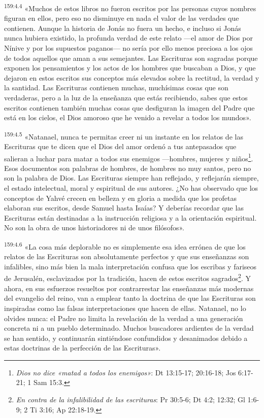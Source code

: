 \par 
\textsuperscript{159:4.4} «Muchos de estos libros no fueron escritos por las personas cuyos nombres figuran en ellos, pero eso no disminuye en nada el valor de las verdades que contienen. Aunque la historia de Jonás no fuera un hecho, e incluso si Jonás nunca hubiera existido, la profunda verdad de este relato ---el amor de Dios por Nínive y por los supuestos paganos--- no sería por ello menos preciosa a los ojos de todos aquellos que aman a sus semejantes. Las Escrituras son sagradas porque exponen los pensamientos y los actos de los hombres que buscaban a Dios, y que dejaron en estos escritos sus conceptos más elevados sobre la rectitud, la verdad y la santidad. Las Escrituras contienen muchas, muchísimas cosas que son verdaderas, pero a la luz de la enseñanza que estás recibiendo, sabes que estos escritos contienen también muchas cosas que desfiguran la imagen del Padre que está en los cielos, el Dios amoroso que he venido a revelar a todos los mundos».

\par 
\textsuperscript{159:4.5} «Natanael, nunca te permitas creer ni un instante en los relatos de las Escrituras que te dicen que el Dios del amor ordenó a tus antepasados que salieran a luchar para matar a todos sus enemigos ---hombres, mujeres y niños\footnote{\textit{Dios no dice «matad a todos los enemigos»}: Dt 13:15-17; 20:16-18; Jos 6:17-21; 1 Sam 15:3.}. Esos documentos son palabras de hombres, de hombres no muy santos, pero no son la palabra de Dios. Las Escrituras siempre han reflejado, y reflejarán siempre, el estado intelectual, moral y espiritual de sus autores. ¿No has observado que los conceptos de Yahvé crecen en belleza y en gloria a medida que los profetas elaboran sus escritos, desde Samuel hasta Isaías? Y deberías recordar que las Escrituras están destinadas a la instrucción religiosa y a la orientación espiritual. No son la obra de unos historiadores ni de unos filósofos».

\par 
\textsuperscript{159:4.6} «La cosa más deplorable no es simplemente esa idea errónea de que los relatos de las Escrituras son absolutamente perfectos y que sus enseñanzas son infalibles, sino más bien la mala interpretación confusa que los escribas y fariseos de Jerusalén, esclavizados por la tradición, hacen de estos escritos sagrados\footnote{\textit{En contra de la infalibilidad de las escrituras}: Pr 30:5-6; Dt 4:2; 12:32; Gl 1:6-9; 2 Ti 3:16; Ap 22:18-19.}. Y ahora, en sus esfuerzos resueltos por contrarrestar las enseñanzas más modernas del evangelio del reino, van a emplear tanto la doctrina de que las Escrituras son inspiradas como las falsas interpretaciones que hacen de ellas. Natanael, no lo olvides nunca: el Padre no limita la revelación de la verdad a una generación concreta ni a un pueblo determinado. Muchos buscadores ardientes de la verdad se han sentido, y continuarán sintiéndose confundidos y desanimados debido a estas doctrinas de la perfección de las Escrituras».

